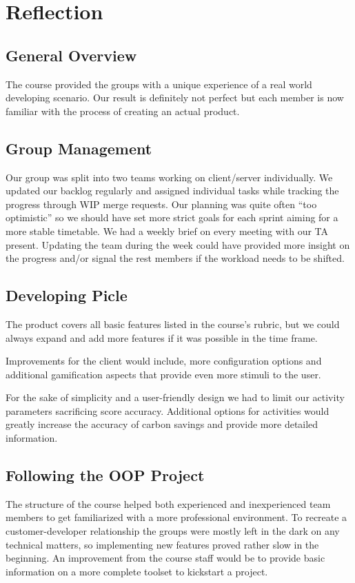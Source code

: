 \chapter{Reflection}\label{ch:reflection}

\section{General Overview}
The course provided the groups with a unique experience of a real world developing scenario. 
Our result is definitely not perfect but each member is now familiar with the process of
creating an actual product.

\section{Group Management}
Our group was split into two teams working on client/server individually.
We updated our backlog regularly and assigned individual tasks while tracking the progress through 
WIP merge requests. Our planning was quite often “too optimistic” so we should have set more strict goals 
for each sprint aiming for a more stable timetable. We had a weekly brief on every meeting with our TA present. 
Updating the team during the week could have provided more insight on the progress and/or signal 
the rest members if the workload needs to be shifted.

\section{Developing Picle}
The product covers all basic features listed in the course’s rubric, 
but we could always expand and add more features if it was possible in the time frame.

Improvements for the client would include, more configuration options
and additional gamification aspects that provide even more stimuli to the user.

For the sake of simplicity and a user-friendly design we had to limit our activity parameters sacrificing score accuracy.
Additional options for activities would greatly increase the accuracy of carbon savings
and provide more detailed information.

\section{Following the OOP Project}
The structure of the course helped both experienced and inexperienced team members to
get familiarized with a more professional environment. 
To recreate a customer-developer relationship the groups were mostly left in the dark 
on any technical matters, so implementing new features proved rather slow in the beginning. 
An improvement from the course staff would be to provide basic information on a more complete toolset to kickstart a project.
